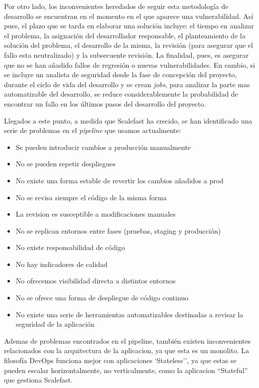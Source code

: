 \documentclass[12pt]{report} %
\begin{document}
Por otro lado, los inconvenientes heredados de seguir
esta metodología de desarrollo se encuentran en el momento en el que aparece una
vulnerabilidad. Así pues, el plazo que se tarda en elaborar una solución
incluye: el tiempo en analizar el problema, la asignación del
desarrollador responsable, el planteamiento de la solución del problema, el
desarrollo de la misma, la revisión (para asegurar que el fallo esta
neutralizado) y la subsecuente revisión. La finalidad, pues, es asegurar que no
se han añadido fallos de regresión o nuevas vulnerabilidades.  En cambio, si se
incluye un analista de seguridad desde la fase de concepción del proyecto,
durante el ciclo de vida del desarrollo y se crean \textit{\gls{job}s}, para
analizar la parte mas automatizable del desarrollo, se reduce considerablemente
la probabilidad de encontrar un fallo en los últimos pasos del desarrollo del
proyecto.

Llegados a este punto, a medida que Scalefast ha crecido, se han identificado
una serie de problemas en el \textit{\gls{pipeline}} que usamos actualmente: 

\begin{itemize} 
  \item{Se pueden introducir cambios a producción manualmente} 
  \item{No se pueden repetir despliegues} 
  \item{No existe una forma estable de revertir los cambios añadidos a prod} 
  \item{No se revisa siempre el código de la misma forma} 
  \item{La revision es susceptible a modificaciones manuales} 
  \item{No se replican entornos entre fases (pruebas, \gls{staging} y producción)} 
  \item{No existe responsabilidad de código} 
  \item{No hay indicadores de calidad}
  \item{No ofrecemos visibilidad directa a distintos entornos}
  \item{No se ofrece una forma de despliegue de código continuo}
  \item{No existe una serie de herramientas automatizables destinadas a revisar
    la seguridad de la aplicación} 
\end{itemize}

Ademas de problemas encontrados en el \gls{pipeline}, también existen
inconvenientes relacionados con la arquitectura de la aplicacion, ya que esta es un
monolito.
La filosofía \gls{DevOps} funciona mejor con aplicaciones `Stateless'', ya que
estas se pueden escalar horizontalmente, no verticalmente, como la aplicacion
``Stateful'' que gestiona Scalefast.
\end{document}
